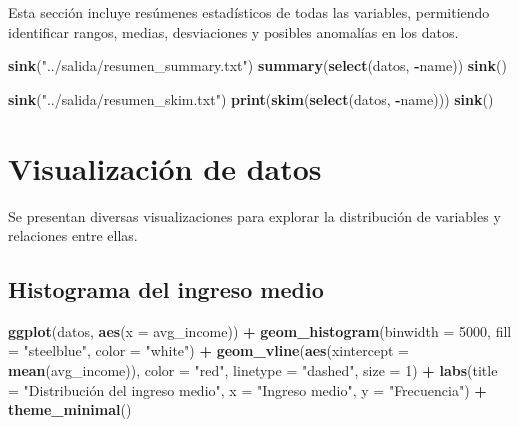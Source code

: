 \documentclass[
]{article}
\newenvironment{Shaded}{\begin{snugshade}}{\end{snugshade}}
\newcommand{\AttributeTok}[1]{\textcolor[rgb]{0.13,0.29,0.53}{#1}}
\newcommand{\DecValTok}[1]{\textcolor[rgb]{0.00,0.00,0.81}{#1}}
\newcommand{\FunctionTok}[1]{\textcolor[rgb]{0.13,0.29,0.53}{\textbf{#1}}}
\newcommand{\NormalTok}[1]{#1}
\newcommand{\SpecialCharTok}[1]{\textcolor[rgb]{0.81,0.36,0.00}{\textbf{#1}}}
\newcommand{\StringTok}[1]{\textcolor[rgb]{0.31,0.60,0.02}{#1}}
\begin{document}
Esta sección incluye resúmenes estadísticos de todas las variables,
permitiendo identificar rangos, medias, desviaciones y posibles
anomalías en los datos.

\begin{Shaded}
\begin{Highlighting}[]
\FunctionTok{sink}\NormalTok{(}\StringTok{"../salida/resumen\_summary.txt"}\NormalTok{)}
\FunctionTok{summary}\NormalTok{(}\FunctionTok{select}\NormalTok{(datos, }\SpecialCharTok{{-}}\NormalTok{name))}
\FunctionTok{sink}\NormalTok{()}
\end{Highlighting}
\end{Shaded}

\begin{Shaded}
\begin{Highlighting}[]
\FunctionTok{sink}\NormalTok{(}\StringTok{"../salida/resumen\_skim.txt"}\NormalTok{)}
\FunctionTok{print}\NormalTok{(}\FunctionTok{skim}\NormalTok{(}\FunctionTok{select}\NormalTok{(datos, }\SpecialCharTok{{-}}\NormalTok{name)))}
\FunctionTok{sink}\NormalTok{()}
\end{Highlighting}
\end{Shaded}

\newpage

\section{Visualización de datos}\label{visualizaciuxf3n-de-datos}

Se presentan diversas visualizaciones para explorar la distribución de
variables y relaciones entre ellas.

\subsection{Histograma del ingreso
medio}\label{histograma-del-ingreso-medio}

\begin{Shaded}
\begin{Highlighting}[]
\FunctionTok{ggplot}\NormalTok{(datos, }\FunctionTok{aes}\NormalTok{(}\AttributeTok{x =}\NormalTok{ avg\_income)) }\SpecialCharTok{+}
  \FunctionTok{geom\_histogram}\NormalTok{(}\AttributeTok{binwidth =} \DecValTok{5000}\NormalTok{, }\AttributeTok{fill =} \StringTok{"steelblue"}\NormalTok{, }\AttributeTok{color =} \StringTok{"white"}\NormalTok{) }\SpecialCharTok{+}
  \FunctionTok{geom\_vline}\NormalTok{(}\FunctionTok{aes}\NormalTok{(}\AttributeTok{xintercept =} \FunctionTok{mean}\NormalTok{(avg\_income)), }\AttributeTok{color =} \StringTok{"red"}\NormalTok{, }\AttributeTok{linetype =} \StringTok{"dashed"}\NormalTok{, }\AttributeTok{size =} \DecValTok{1}\NormalTok{) }\SpecialCharTok{+}
  \FunctionTok{labs}\NormalTok{(}\AttributeTok{title =} \StringTok{"Distribución del ingreso medio"}\NormalTok{, }\AttributeTok{x =} \StringTok{"Ingreso medio"}\NormalTok{, }\AttributeTok{y =} \StringTok{"Frecuencia"}\NormalTok{) }\SpecialCharTok{+}
  \FunctionTok{theme\_minimal}\NormalTok{()}
\end{Highlighting}
\end{Shaded}
\end{document}
